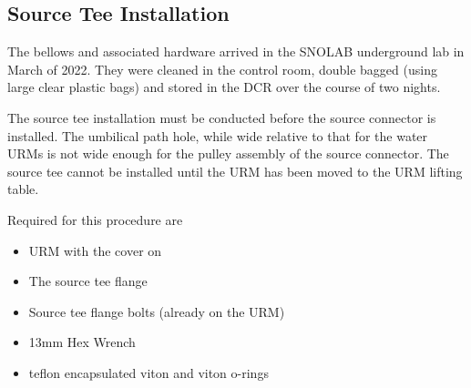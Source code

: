 \documentclass[11pt]{article}
\begin{document}

\subsection{Source Tee Installation}\label{ss:SourceTeeInstall}
The bellows and associated hardware arrived in the SNOLAB underground lab in March of 2022. They were cleaned in the control room, double bagged (using large clear plastic bags) and stored in the DCR over the course of two nights.

The source tee installation must be conducted before the source
connector is installed. The umbilical path hole, while wide relative
to that for the water URMs is not wide enough for the pulley assembly
of the source connector. The source tee cannot be installed until the
URM has been moved to the URM lifting table.

Required for this procedure are
\begin{itemize}[label={$\square$}]
\item URM with the cover on
\item The source tee flange
\item Source tee flange bolts (already on the URM)
\item 13mm Hex Wrench
\item teflon encapsulated viton and viton o-rings
\end{itemize}
\end{document}
